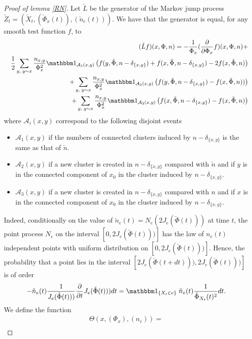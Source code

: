 \documentclass[11pt,a4paper]{amsart}
\numberwithin{equation}{section}
\def\demi{{1\over 2}}
\def\aaa{\mathcal{A}}
\def\indic{{{\mathbbm 1}}}
\begin{document}
\begin{proof}[Proof of lemma \ref{RN}]
Let $\check L$ be the generator of the Markov jump process $\check Z_t=(\check X_t, (\check \Phi_x(t)), (\check n_e(t)))$.
We have that the generator is equal, for any smooth test function $f$, to
\begin{eqnarray*}
&&(\check L f)(x,\Phi, n)=
-{1\over  \Phi_x} ({\partial\over \partial \Phi_x}f)(x,\Phi,  n) +\\
&&\demi \sum_{y, \; y\sim x}{ n_{x,y} \over  \Phi_x^2}
{\indic_{\aaa_1(x,y)}} \left(f(y,\tilde\Phi,n-\delta_{\{x,y\}})+f(x,\tilde\Phi,n-\delta_{\{x,y\}})- 2f(x,\tilde\Phi,n)\right)
\\
&&+ \sum_{y, \; y\sim x}{ n_{x,y} \over \Phi_x^2}  \indic_{\aaa_2(x,y)} \left( f(y,\tilde\Phi,n-\delta_{\{x,y\}})- f(x,\tilde\Phi,n)) \right)
\\
&&+\sum_{y, \; y\sim x}{n_{x,y} \over \Phi_x^2} 
 \indic_{\aaa_3(x,y)} \left(f(x,\tilde\Phi,n-\delta_{\{x,y\}}) - f(x,\tilde\Phi,n) \right)
\end{eqnarray*}
where 
$\aaa_{i}(x,y)$ correspond to the following disjoint events
\begin{itemize}
\item
$\aaa_1(x,y)$ if the numbers of connected clusters induced by $n-\delta_{\{x,y\}}$ is the same as that of $\check n$.
\item
$\aaa_2(x,y)$ if a new cluster is created in $ n-\delta_{\{x,y\}}$ compared with $\check n$ and if $y$ is in the connected component
of $x_0$ in the cluster induced by $ n-\delta_{\{x,y\}}$.
\item
$\aaa_3(x,y)$ if a new cluster is created in $ n-\delta_{\{x,y\}}$ compared with $n$ and if $x$ is in the connected component
of $x_0$ in the cluster induced by $ n-\delta_{\{x,y\}}$.
\end{itemize}
Indeed, conditionally on the value of $\check n_e(t)=N_e(2J_e(\check\Phi(t)))$ at time $t$, the point process $N_e$ on the interval $[0,  2J_e(\check\Phi(t)))]$ has the law of
$n_e(t)$ independent points with uniform distribution on $[0,  2J_e(\check\Phi(t)))]$. Hence, the probability that a point lies in the interval 
$[2J_e(\check\Phi(t+dt))),  2J_e(\check\Phi(t)))]$ is of order 
$$
-\check n_e(t) {1\over J_e(\check\Phi(t)))}{\partial\over \partial t} J_e(\check\Phi(t)))  dt= \indic_{\{X_t\in e\}}\;\check n_e(t){1\over \check\Phi_{X_t}(t)^2}dt.
$$
We define the function 
\begin{multline}
\nonumber\Theta(x,(\Phi_x),(n_e))=\\

\end{multline}
\end{proof}
\end{document}
